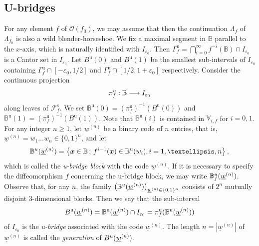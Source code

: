 \documentclass{amsart}
\theoremstyle{definition}
\numberwithin{equation}{section}
\numberwithin{figure}{section}
\begin{document}
\subsection{U-bridges}\label{ss_u-bridge}
For any element $f$ of $\mathcal{O}(f_0)$, we may assume that 
then the continuation $\Lambda_f$ of $\Lambda_{f_0}$ is also a wild blender-horseshoe.
We fix a maximal segment in $\mathbb{B}$ parallel to the $x$-axis, which is  
naturally identified with $I_{\varepsilon_0}$.
Then $\varGamma_f^{\mathrm{u}}=\bigcap_{i=0}^\infty f^{-i}(\mathbb{B})\cap I_{\varepsilon_0}$ is a Cantor set in $I_{\varepsilon_0}$.
Let $B^{\mathrm{u}}(0)$ and $B^{\mathrm{u}}(1)$ be the smallest sub-intervals of $I_{\varepsilon_0}$ containing 
$\varGamma_f^{\mathrm{u}}\cap [-\varepsilon_0,1/2]$ and $\varGamma_f^{\mathrm{u}}\cap [1/2,1+\varepsilon_0]$ 
respectively.
Consider the continuous projection
$$\pi^{\rm u}_{f}:\mathbb{B}\longrightarrow
I_{\varepsilon_0}
\index{piuf@$\pi^{\rm u}_{f}$}
$$
along leaves of $\mathcal{F}_f^{\mathrm{s}}$.
We set $\mathbb{B}^{\mathrm{u}}(0)=(\pi_f^{\mathrm{u}})^{-1}(B^{\mathrm{u}}(0))$ and  $\mathbb{B}^{\mathrm{u}}(1)=(\pi_f^{\mathrm{u}})^{-1}(B^{\mathrm{u}}(1))$.
Note that $\mathbb{B}^{\mathrm{u}}(i)$ is contained in $\mathbb{V}_{i,f}$ for $i=0,1$.
For any integer $n\geq 1$, let  
$\underline{w}^{(n)}$ be a binary code of $n$ entries, that is, $\underline{w}^{(n)}=w_{1}\dots w_{n}\in \{0,1\}^{n}$, 
and let 
\begin{equation}\label{eqn_BBu}
\mathbb{B}^{\rm u}(\underline{w}^{(n)})\index{Buwn@$\mathbb{B}^{\mathrm u}(\underline{w}^{(n)})$}
=\left\{\boldsymbol{x}\in \mathbb{B}\,;\, f^{i-1}(\boldsymbol{x})\in \mathbb{B}^{\mathrm{u}}(w_i),
i=1,\dots,n\right\},  
\end{equation}
which is  called the \emph{u-bridge block} with the code $\underline{w}^{(n)}$. 
If it is necessary to specify the diffeomorphism $f$ concerning the u-bridge block, 
we may write $\mathbb{B}_{f}^{\rm u}(\underline{w}^{(n)})$.
Observe that, for any $n$, the family  
$\bigl(\mathbb{B}^{\rm u}(\underline{w}^{(n)})\bigr)_{\underline{w}^{(n)}\in \{0,1\}^{n}}$ 
consists of $2^{n}$ mutually disjoint 3-dimensional blocks. 
Then we say that the sub-interval  
\begin{equation}\label{eqn_BuBu}
B^{\mathrm{u}}(\underline{w}^{(n)})\index{Buwn@$B^{\mathrm{u}}(\underline{w}^{(n)})$}=\mathbb{B}^{\mathrm{u}}(\underline{w}^{(n)})\cap I_{\varepsilon_0}
=\pi_f^{\mathrm{u}}(\mathbb{B}^{\mathrm{u}}(\underline{w}^{(n)}))
\end{equation}
of $I_{\varepsilon_0}$ is the \emph{u-bridge} associated with the code $\underline{w}^{(n)}$.
The length $n=|\underline{w}^{(n)}|$ of $\underline{w}^{(n)}$ is called the \emph{generation} of $B^{\rm u}(\underline{w}^{(n)})$.
\end{document}
